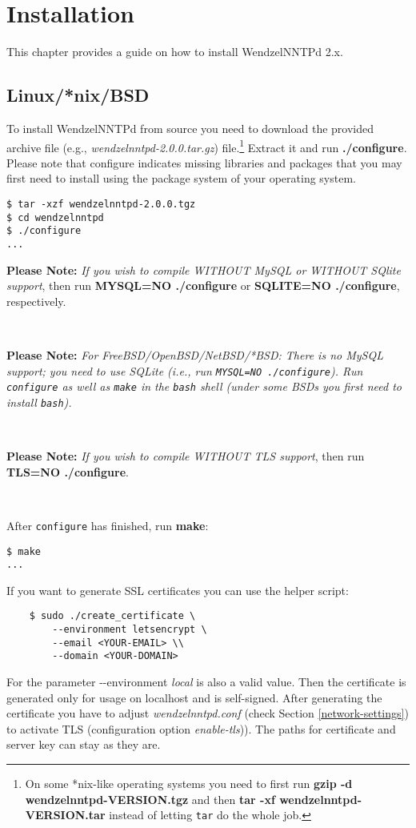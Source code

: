 \chapter{Installation}

This chapter provides a guide on how to install WendzelNNTPd 2.x.

\section{Linux/*nix/BSD}

To install WendzelNNTPd from source you need to download the provided archive file (e.g., \emph{wendzelnntpd-2.0.0.tar.gz}) file.\footnote{On some *nix-like operating systems you need to first run \textbf{gzip -d wendzelnntpd-VERSION.tgz} and then \textbf{tar -xf wendzelnntpd-VERSION.tar} instead of letting \texttt{tar} do the whole job.} Extract it and run \textbf{./configure}. Please note that configure indicates missing libraries and packages that you may first need to install using the package system of your operating system.

\begin{verbatim}
$ tar -xzf wendzelnntpd-2.0.0.tgz
$ cd wendzelnntpd
$ ./configure
...
\end{verbatim}

\textbf{Please Note:} \textit{If you wish to compile WITHOUT MySQL or WITHOUT SQlite support}, then run \textbf{MYSQL=NO ./configure} or \textbf{SQLITE=NO ./configure}, respectively.

~

\textbf{Please Note:} \textit{For FreeBSD/OpenBSD/NetBSD/*BSD: There is no MySQL support; you need to use SQLite (i.e., run \texttt{MYSQL=NO ./configure}). Run \texttt{configure} as well as \texttt{make} in the \texttt{bash} shell (under some BSDs you first need to install \texttt{bash}).}

~

\textbf{Please Note:} \textit{If you wish to compile WITHOUT TLS support}, then run \textbf{TLS=NO ./configure}.

~

After \texttt{configure} has finished, run \textbf{make}:

\begin{verbatim}
$ make
...
\end{verbatim}

If you want to generate SSL certificates you can use the helper script:
\begin{verbatim}
	$ sudo ./create_certificate \
		--environment letsencrypt \
		--email <YOUR-EMAIL> \\
		--domain <YOUR-DOMAIN>
\end{verbatim}
For the parameter -{}-environment \textit{local} is also a valid value. Then the certificate is generated only for usage on localhost and is self-signed. After generating the certificate you have to adjust \textit{wendzelnntpd.conf} (check Section \ref{network-settings}) to activate TLS (configuration option \textit{enable-tls})). The paths for certificate and server key can stay as they are. 

